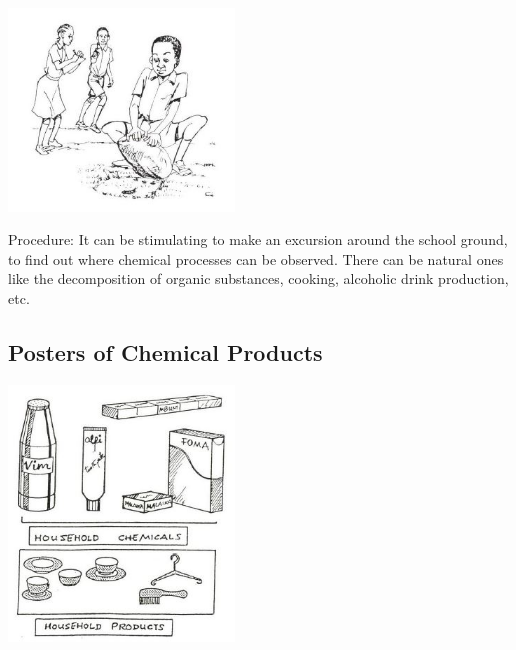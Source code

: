 \begin{multicols}{2}
\begin{center}
\includegraphics[width=0.45\textwidth]{./img/source/excursion.jpg}
\end{center}

\begin{description*}
\item[Procedure:]{It can be stimulating to make an excursion
around the school ground, to find out where
chemical processes can be observed. There can
be natural ones like the decomposition of organic
substances, cooking, alcoholic drink
production, etc.}
\end{description*}

\subsection{Posters of Chemical Products}  

\begin{center}
\includegraphics[width=0.45\textwidth]{./img/source/chemical-posters.jpg}
\end{center}


\end{multicols}
